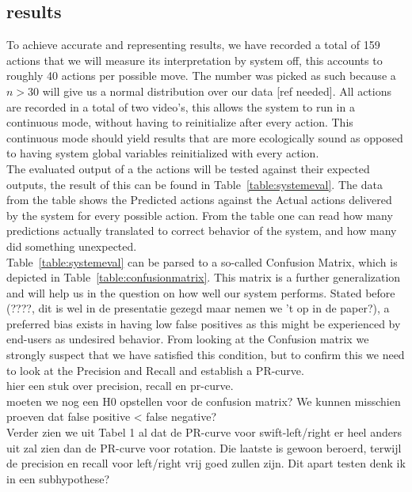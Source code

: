 \documentclass[11pt,a4paper]{article}
\begin{document}
\subsection{results}
To achieve accurate and representing results, we have recorded a total of 159 actions that we will measure its interpretation by system off, this accounts to roughly 40 actions per possible move.  The number was picked as such because a $n > 30$ will give us a normal distribution over our data [ref needed]. All actions are recorded in a total of two video's, this allows the system to run in a continuous mode, without having to reinitialize after every action. This continuous mode should yield results that are more ecologically sound as opposed to having system global variables reinitialized with every action.
\\ The evaluated output of a the actions will be tested against their expected outputs, the result of this can be found in Table~\ref{table:systemeval}. The data from the table shows the Predicted actions against the Actual actions delivered by the system for every possible action. From the table one can read how many predictions actually translated to correct behavior of the system, and how many did something unexpected.
\\ Table~\ref{table:systemeval} can be parsed to a so-called Confusion Matrix, which is depicted in Table~\ref{table:confusionmatrix}. This matrix is a further generalization and will help us in the question on how well our system performs. Stated before (????, dit is wel in de presentatie gezegd maar nemen we 't op in de paper?), a preferred bias exists in having low false positives as this might be experienced by end-users as undesired behavior. From looking at the Confusion matrix we strongly suspect that we have satisfied this condition, but to confirm this we need to look at the Precision and Recall and establish a PR-curve.
\\ hier een stuk over precision, recall en pr-curve.
\\ moeten we nog een H0 opstellen voor de confusion matrix? We kunnen misschien proeven dat false positive < false negative?
\\ Verder zien we uit Tabel 1 al dat de PR-curve voor swift-left/right er heel anders uit zal zien dan de PR-curve voor rotation. Die laatste is gewoon beroerd, terwijl de precision en recall voor left/right vrij goed zullen zijn. Dit apart testen denk ik in een subhypothese?
\end{document}
